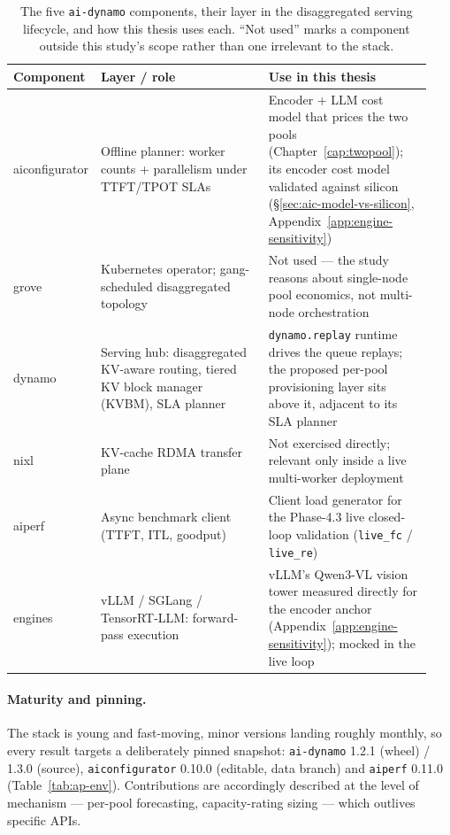 \begin{table}[htbp]
\centering
\caption{The five \texttt{ai-dynamo} components, their layer in the disaggregated
serving lifecycle, and how this thesis uses each. ``Not used'' marks a component
outside this study's scope rather than one irrelevant to the stack.}
\label{tab:app-ecosystem}
\small
\setlength{\tabcolsep}{4pt}
\begin{tabular}{@{}>{\raggedright\arraybackslash}p{0.15\linewidth}>{\raggedright\arraybackslash}p{0.40\linewidth}>{\raggedright\arraybackslash}p{0.39\linewidth}@{}}
\toprule
Component & Layer / role & Use in this thesis \\
\midrule
aiconfigurator & Offline planner: worker counts + parallelism under TTFT/TPOT SLAs &
  Encoder + LLM cost model that prices the two pools (Chapter~\ref{cap:twopool}); its
  encoder cost model validated against silicon (\S\ref{sec:aic-model-vs-silicon},
  Appendix~\ref{app:engine-sensitivity}) \\
grove & Kubernetes operator; gang-scheduled disaggregated topology &
  Not used --- the study reasons about single-node pool economics, not multi-node
  orchestration \\
dynamo & Serving hub: disaggregated KV-aware routing, tiered KV block manager (KVBM), SLA planner &
  \texttt{dynamo.replay} runtime drives the queue replays; the proposed per-pool
  provisioning layer sits above it, adjacent to its SLA planner \\
nixl & KV-cache RDMA transfer plane &
  Not exercised directly; relevant only inside a live multi-worker deployment \\
aiperf & Async benchmark client (TTFT, ITL, goodput) &
  Client load generator for the Phase-4.3 live closed-loop validation
  (\texttt{live\_fc} / \texttt{live\_re}) \\
\midrule
engines & vLLM / SGLang / TensorRT-LLM: forward-pass execution &
  vLLM's Qwen3-VL vision tower measured directly for the encoder anchor
  (Appendix~\ref{app:engine-sensitivity}); mocked in the live loop \\
\bottomrule
\end{tabular}
\end{table}

\paragraph{Maturity and pinning.} The stack is young and fast-moving, minor
versions landing roughly monthly, so every result targets a deliberately pinned
snapshot: \texttt{ai-dynamo} 1.2.1 (wheel) / 1.3.0 (source),
\texttt{aiconfigurator} 0.10.0 (editable, data branch) and \texttt{aiperf}
0.11.0 (Table~\ref{tab:ap-env}). Contributions are accordingly described at the
level of mechanism --- per-pool forecasting, capacity-rating sizing --- which
outlives specific APIs.


